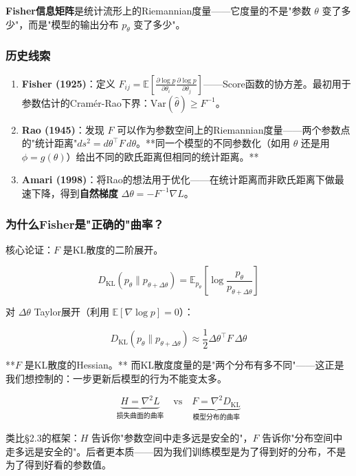 \documentclass[12pt,a4paper]{article}
\begin{document}
\textbf{Fisher信息矩阵}是统计流形上的Riemannian度量——它度量的不是"参数 $\theta$ 变了多少"，而是"模型的输出分布 $p_\theta$ 变了多少"。


\subsubsection{历史线索}

\begin{enumerate}[leftmargin=*,nosep]
\item \textbf{Fisher (1925)}：定义 $F_{ij} = \mathbb{E}\left[\frac{\partial \log p}{\partial \theta_i}\frac{\partial \log p}{\partial \theta_j}\right]$——Score函数的协方差。最初用于参数估计的Cramér-Rao下界：$\text{Var}(\hat\theta) \ge F^{-1}$。

\item \textbf{Rao (1945)}：发现 $F$ 可以作为参数空间上的Riemannian度量——两个参数点的"统计距离"$ds^2 = d\theta^\top F\,d\theta$。**同一个模型的不同参数化（如用 $\theta$ 还是用 $\phi = g(\theta)$）给出不同的欧氏距离但相同的统计距离。**

\item \textbf{Amari (1998)}：将Rao的想法用于优化——在统计距离而非欧氏距离下做最速下降，得到\textbf{自然梯度} $\Delta\theta = -F^{-1}\nabla L$。
\end{enumerate}



\subsubsection{为什么Fisher是"正确的"曲率？}

核心论证：$F$ 是KL散度的二阶展开。


\[D_{\text{KL}}(p_\theta \| p_{\theta+\Delta\theta}) = \mathbb{E}_{p_\theta}\left[\log\frac{p_\theta}{p_{\theta+\Delta\theta}}\right]\]

对 $\Delta\theta$ Taylor展开（利用 $\mathbb{E}[\nabla\log p] = 0$）：


\[D_{\text{KL}}(p_\theta \| p_{\theta+\Delta\theta}) \approx \frac{1}{2}\Delta\theta^\top F\,\Delta\theta\]

**$F$ 是KL散度的Hessian。** 而KL散度度量的是"两个分布有多不同"——这正是我们想控制的：一步更新后模型的行为不能变太多。


\[\underbrace{H = \nabla^2 L}_{\text{损失曲面的曲率}} \quad \text{vs} \quad \underbrace{F = \nabla^2 D_{\text{KL}}}_{\text{模型分布的曲率}}\]

类比§2.3的框架：$H$ 告诉你"参数空间中走多远是安全的"，$F$ 告诉你"分布空间中走多远是安全的"。后者更本质——因为我们训练模型是为了得到好的分布，不是为了得到好看的参数值。
\end{document}
